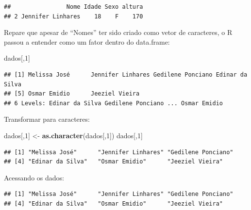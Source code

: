 \documentclass[
]{book}
\newenvironment{Shaded}{\begin{snugshade}}{\end{snugshade}}
\newcommand{\DecValTok}[1]{\textcolor[rgb]{0.00,0.00,0.81}{#1}}
\newcommand{\KeywordTok}[1]{\textcolor[rgb]{0.13,0.29,0.53}{\textbf{#1}}}
\newcommand{\NormalTok}[1]{#1}
\newcommand{\OperatorTok}[1]{\textcolor[rgb]{0.81,0.36,0.00}{\textbf{#1}}}
\newcommand{\StringTok}[1]{\textcolor[rgb]{0.31,0.60,0.02}{#1}}
\begin{document}
\begin{verbatim}
##                Nome Idade Sexo altura
## 2 Jennifer Linhares    18    F    170
\end{verbatim}

Repare que apesar de ``Nomes'' ter sido criado como vetor de caracteres, o R passou a entender como um fator dentro do data.frame:

\begin{Shaded}
\begin{Highlighting}[]
\NormalTok{dados[,}\DecValTok{1}\NormalTok{]}
\end{Highlighting}
\end{Shaded}

\begin{verbatim}
## [1] Melissa José      Jennifer Linhares Gedilene Ponciano Edinar da Silva  
## [5] Osmar Emidio      Jeeziel Vieira   
## 6 Levels: Edinar da Silva Gedilene Ponciano ... Osmar Emidio
\end{verbatim}

Transformar para caracteres:

\begin{Shaded}
\begin{Highlighting}[]
\NormalTok{dados[,}\DecValTok{1}\NormalTok{] <-}\StringTok{ }\KeywordTok{as.character}\NormalTok{(dados[,}\DecValTok{1}\NormalTok{])}
\NormalTok{dados[,}\DecValTok{1}\NormalTok{]}
\end{Highlighting}
\end{Shaded}

\begin{verbatim}
## [1] "Melissa José"      "Jennifer Linhares" "Gedilene Ponciano"
## [4] "Edinar da Silva"   "Osmar Emidio"      "Jeeziel Vieira"
\end{verbatim}

Acessando os dados:

\begin{Shaded}
\end{Shaded}

\begin{verbatim}
## [1] "Melissa José"      "Jennifer Linhares" "Gedilene Ponciano"
## [4] "Edinar da Silva"   "Osmar Emidio"      "Jeeziel Vieira"
\end{verbatim}

\begin{Shaded}
\end{Shaded}
\end{document}

